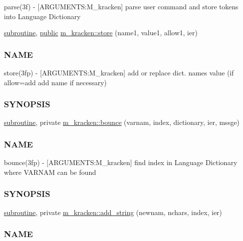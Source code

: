 \begin{DoxyCompactItemize}
\begin{DoxyCompactList}
parse(3f) -\/ \mbox{[}A\+R\+G\+U\+M\+E\+N\+TS\+:M\+\_\+kracken\mbox{]} parse user command and store tokens into Language Dictionary \end{DoxyCompactList}\item 
\hyperlink{M__stopwatch_83_8txt_acfbcff50169d691ff02d4a123ed70482}{subroutine}, \hyperlink{M__stopwatch_83_8txt_a2f74811300c361e53b430611a7d1769f}{public} \hyperlink{namespacem__kracken_a6eb597e3ca7d161933f595788d511fd7}{m\+\_\+kracken\+::store} (name1, value1, allow1, ier)
\begin{DoxyCompactList}\small\item\em \subsubsection*{N\+A\+ME}

store(3fp) -\/ \mbox{[}A\+R\+G\+U\+M\+E\+N\+TS\+:M\+\_\+kracken\mbox{]} add or replace dict. name\textquotesingle{}s value (if allow=\textquotesingle{}add\textquotesingle{} add name if necessary) \subsubsection*{S\+Y\+N\+O\+P\+S\+IS}\end{DoxyCompactList}\item 
\hyperlink{M__stopwatch_83_8txt_acfbcff50169d691ff02d4a123ed70482}{subroutine}, private \hyperlink{namespacem__kracken_af9225957a50e8e0559605911c4c5ee02}{m\+\_\+kracken\+::bounce} (varnam, index, dictionary, ier, mssge)
\begin{DoxyCompactList}\small\item\em \subsubsection*{N\+A\+ME}

bounce(3fp) -\/ \mbox{[}A\+R\+G\+U\+M\+E\+N\+TS\+:M\+\_\+kracken\mbox{]} find index in Language Dictionary where V\+A\+R\+N\+AM can be found \subsubsection*{S\+Y\+N\+O\+P\+S\+IS}\end{DoxyCompactList}\item 
\hyperlink{M__stopwatch_83_8txt_acfbcff50169d691ff02d4a123ed70482}{subroutine}, private \hyperlink{namespacem__kracken_a21998bf9ab683f8fb661f4f4b916c21f}{m\+\_\+kracken\+::add\+\_\+string} (newnam, nchars, index, ier)
\begin{DoxyCompactList}\small\item\em \subsubsection*{N\+A\+ME}


\end{DoxyCompactList}
\end{DoxyCompactItemize}
